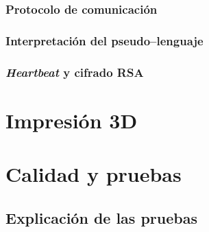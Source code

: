 \subsection{Protocolo de comunicación}

\subsection{Interpretación del pseudo--lenguaje}

\subsection{\textit{Heartbeat} y cifrado RSA}


\chapter{Impresión 3D}
% 
% 
% 

\chapter{Calidad y pruebas}

% 
\section{Explicación de las pruebas}

%
%


